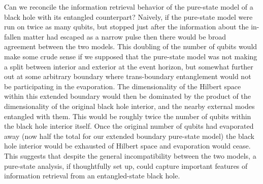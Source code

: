 \documentclass[twocolumn,aps,prl]{revtex4}
\begin{document}
Can we reconcile the information retrieval behavior of the pure-state
model of a black hole with its entangled counterpart? Naively,
if the pure-state model were run on twice as many qubits, but stopped
just after the information about the in-fallen matter had escaped
as a narrow pulse then there would be broad agreement between the
two models. This doubling of the number of qubits would make some
crude sense if we supposed that the pure-state model was not making
a split between interior and exterior at the event horizon, but
somewhat further out at some arbitrary boundary where trans-boundary
entanglement would not be participating in the evaporation. The
dimensionality of the Hilbert space within this extended boundary
would then be dominated by the product of the dimensionality of the
original black hole interior, and the nearby external modes entangled
with them. This would be roughly twice the number of qubits within the
black hole interior itself. Once the original number of qubits had
evaporated away (now half the total for our extended boundary
pure-state model) the black hole interior would be exhausted of
Hilbert space and evaporation would cease. This suggests that
despite the general incompatibility between the two models, a
pure-state analysis, if thoughtfully set up, could capture important
features of information retrieval from an entangled-state black hole.
\end{document}
